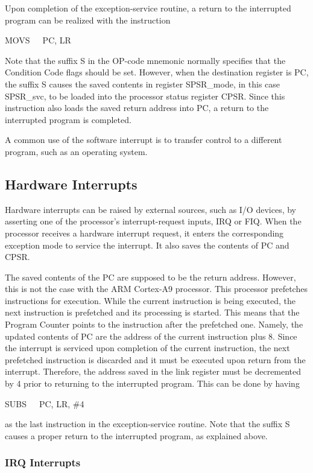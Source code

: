 \documentclass[11pt, twoside, pdftex]{article}
\begin{document}
Upon completion of the exception-service routine, a return to the
interrupted program can be realized with the instruction
\begin{center}
MOVS~~~PC, LR
\end{center}
\noindent
Note that the suffix S in the OP-code mnemonic normally specifies
that the Condition Code flags should be set. However, when the
destination register is PC, the suffix S causes the saved
contents in register SPSR\_mode, in this case SPSR\_svc, to 
be loaded into the processor status register CPSR. Since this
instruction also loads the saved return address into PC, a return
to the interrupted program is completed.

A common use of the software interrupt is to transfer control to
a different program, such as an operating system.

\subsection{Hardware Interrupts}

Hardware interrupts can be raised by external sources, such as
I/O devices, by asserting one of the processor's
interrupt-request inputs, IRQ or FIQ.
When the processor receives a hardware interrupt request, it
enters the corresponding exception mode to service the interrupt.
It also saves the contents of PC and CPSR. 

The saved contents of the PC are supposed to be the return
address. However, this is not the case with the ARM Cortex-A9
processor. This processor prefetches instructions for execution.
While the current instruction is being executed, the next
instruction is prefetched and its processing is started.
This means that the Program Counter points to the instruction
after the prefetched one. Namely, the updated contents of PC
are the address of the current instruction plus 8.
Since the interrupt is serviced upon completion of the current
instruction, the next prefetched instruction is discarded and
it must be executed upon return from the interrupt. Therefore,
the address saved in the link register must be decremented
by 4 prior to returning to the interrupted program.
This can be done by having
\begin{center}
SUBS~~~PC, LR, \#4
\end{center}
\noindent
as the last instruction in the exception-service routine.
Note that the suffix S causes a proper return to the interrupted
program, as explained above.

\subsubsection{IRQ Interrupts}
\end{document}

